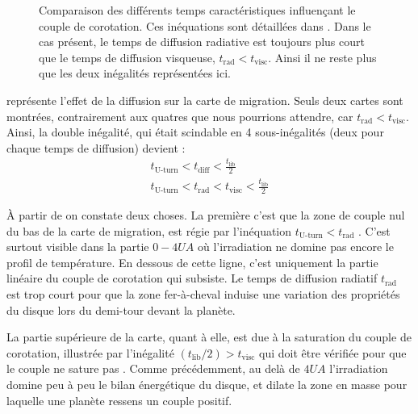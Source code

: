 \begin{figure}[htb]
\centering
{}\hfill
{}

\caption{Comparaison des différents temps caractéristiques influençant le couple de corotation. Ces inéquations sont détaillées dans . Dans le cas présent, le temps de diffusion radiative est toujours plus court que le temps de diffusion visqueuse, $t_\text{rad}<t_\text{visc}$. Ainsi il ne reste plus que les deux inégalités représentées ici.}\label{fig:timescales_maps}
\end{figure}

 représente l'effet de la diffusion sur la carte de migration. Seuls deux cartes sont montrées, contrairement aux quatres que nous pourrions attendre, car $t_\text{rad}<t_\text{visc}$. Ainsi, la double inégalité, qui était scindable en 4 sous-inégalités (deux pour chaque temps de diffusion) devient :
\begin{align}
t_\text{U-turn} < t_\text{diff} < \frac{t_\text{lib}}{2}\\
t_\text{U-turn} < t_\text{rad} < t_\text{visc} < \frac{t_\text{lib}}{2}
\end{align}

À partir de  on constate deux choses. La première c'est que la zone de couple nul du bas de la carte de migration, est régie par l'inéquation $t_\text{U-turn} < t_\text{rad}$ . C'est surtout visible dans la partie $0-4\unit{UA}$ où l'irradiation ne domine pas encore le profil de température. En dessous de cette ligne, c'est uniquement la partie linéaire du couple de corotation qui subsiste. Le temps de diffusion radiatif $t_\text{rad}$ est trop court pour que la zone fer-à-cheval induise une variation des propriétés du disque lors du demi-tour devant la planète. 

La partie supérieure de la carte, quant à elle, est due à la saturation du couple de corotation, illustrée par l'inégalité $(t_\text{lib}/2) > t_\text{visc}$ qui doit être vérifiée pour que le couple ne sature pas . Comme précédemment, au delà de $4\unit{UA}$ l'irradiation domine peu à peu le bilan énergétique du disque, et dilate la zone en masse pour laquelle une planète ressens un couple positif.


